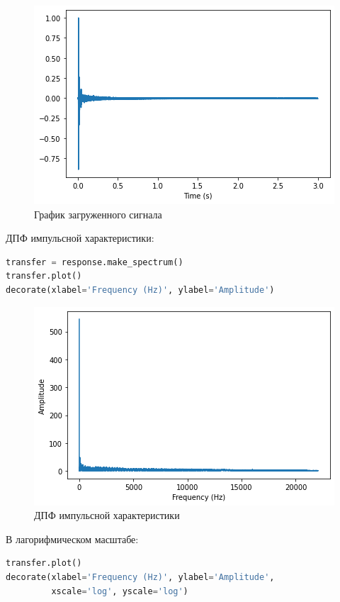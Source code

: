 \begin{figure}[H]
	\begin{center}
		\includegraphics[scale=1]{fig/lab10/lab10_05.png}
		\caption{График загруженного сигнала}
	\end{center}
\end{figure}

ДПФ импульсной характеристики:

\begin{lstlisting}[language=Python]
transfer = response.make_spectrum()
transfer.plot()
decorate(xlabel='Frequency (Hz)', ylabel='Amplitude')
\end{lstlisting}

\begin{figure}[H]
	\begin{center}
		\includegraphics[scale=1]{fig/lab10/lab10_06.png}
		\caption{ДПФ импульсной характеристики}
	\end{center}
\end{figure}

В лагорифмическом масштабе:

\begin{lstlisting}[language=Python]
transfer.plot()
decorate(xlabel='Frequency (Hz)', ylabel='Amplitude',
         xscale='log', yscale='log')
\end{lstlisting}

